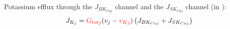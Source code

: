 \documentclass[fleqn]{report}
\numberwithin{equation}{section}
\numberwithin{equation}{section}
\begin{document}
%							
							Potassium efflux through the $J_{BK_{Caj}}$ channel and the $J_{SK_{Caj}}$ channel (in \uMs):
							\begin{equation} \label{eq:JKj}
							J_{K_{j}} = \textcolor{red}{G_{totj}} (v_{j}-\textcolor{red}{v_{Kj}}) \left(   J_{BK_{Caj}} + J_{SK_{Caj}} \right) 
							\end{equation}
\end{document}
